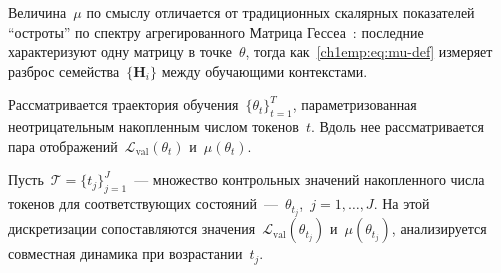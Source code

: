 Величина~$\mu$ по смыслу отличается от традиционных скалярных показателей ``остроты'' по спектру агрегированного Матрица Гессеа~\cite{pmlr-v97-ghorbani19b, papyan2019spectrumdeepnethessiansscale, wu2022dissecting}: последние характеризуют одну матрицу в точке~$\theta$, тогда как~\eqref{ch1emp:eq:mu-def} измеряет разброс семейства~$\{\mathbf{H}_i\}$ между обучающими контекстами.

Рассматривается траектория обучения~$\{\theta_t\}_{t=1}^{T}$, параметризованная неотрицательным накопленным числом токенов~$t$.
Вдоль нее рассматривается пара отображений~$\mathcal{L}_{\mathrm{val}}(\theta_t)$ и~$\mu(\theta_t)$.

Пусть~$\mathcal{T}=\{t_j\}_{j=1}^{J}$~--- множество контрольных значений накопленного числа токенов для соответствующих состояний~---~$\theta_{t_j}$,~$j=1,\ldots,J$.
На этой дискретизации сопоставляются значения~$\mathcal{L}_{\mathrm{val}}(\theta_{t_j})$ и~$\mu(\theta_{t_j})$, анализируется совместная динамика при возрастании~$t_j$.

